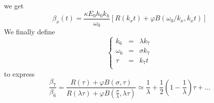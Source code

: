 \documentclass[aps,onecolumn,12pt]{revtex4}
\begin{document}
we get
\begin{equation}
	\beta_x(t) =  \dfrac{\kappa E_0 h_0 k_h}{\omega_0} \left[
	R(k_xt) + \varphi B(\omega_0/k_x,k_xt)
	\right]
\end{equation}
We finally define
\begin{equation}
\left\lbrace
\begin{array}{rcl}
	k_6 & = & \lambda k_7\\
	\omega_0 & = & \sigma k_7 \\
	\tau & = & k_7 t\\
\end{array}
\right.
\end{equation}
to express
\begin{equation}
		\dfrac{\beta_7}{\beta_6} = \dfrac{ R(\tau) + \varphi B(\sigma,\tau) }{R(\lambda \tau) + \varphi B(\frac{\sigma}{\lambda},\lambda \tau)} \simeq \dfrac{1}{\lambda} + \dfrac{1}{2} \left(1-\dfrac{1}{\lambda}\right) \tau + \ldots
\end{equation}
\end{document}
